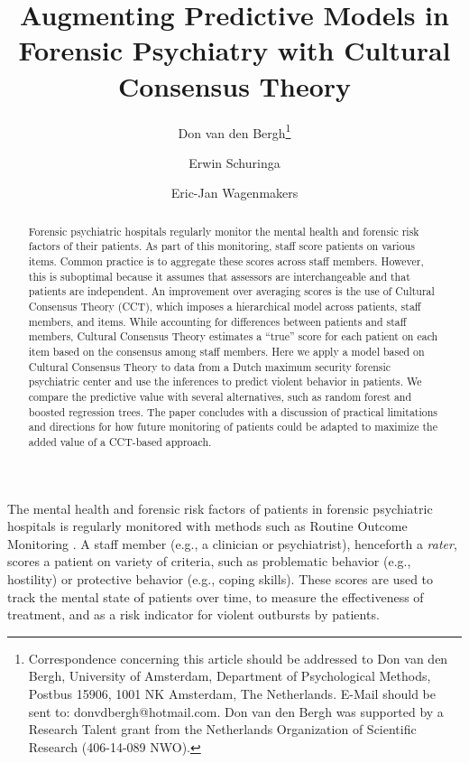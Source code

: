 \documentclass[a4paper,11pt]{article}
\title{Augmenting Predictive Models in Forensic Psychiatry with Cultural Consensus Theory}
\author[1]{Don van den Bergh\thanks{%
Correspondence concerning this article should be addressed to Don van den Bergh, University of Amsterdam, Department of Psychological Methods, Postbus 15906, 1001 NK Amsterdam, The Netherlands. 
E-Mail should be sent to: donvdbergh@hotmail.com.
Don van den Bergh was supported by a Research Talent grant from the Netherlands Organization of Scientific Research (406-14-089 NWO).}}
\author[2]{Erwin Schuringa}
\author[1]{Eric-Jan Wagenmakers}
\affil[1]{Department of Psychological Methods, University of Amsterdam}
\affil[2]{Forensic Psychiatric Center Dr. S. van Mesdag}
\date{}
\begin{document}
\maketitle


\begin{abstract}
Forensic psychiatric hospitals regularly monitor the mental health and forensic risk factors of their patients.
As part of this monitoring, staff score patients on various items.
Common practice is to aggregate these scores across staff members.
However, this is suboptimal because it assumes that assessors are interchangeable and that patients are independent.
An improvement over averaging scores is the use of Cultural Consensus Theory (CCT), which imposes a hierarchical model across patients, staff members, and items.
While accounting for differences between patients and staff members, Cultural Consensus Theory estimates a ``true'' score for each patient on each item based on the consensus among staff members.
Here we apply a model based on Cultural Consensus Theory to data from a Dutch maximum security forensic psychiatric center and use the inferences to predict violent behavior in patients.
We compare the predictive value with several alternatives, such as random forest and boosted regression trees.
The paper concludes with a discussion of practical limitations and directions for how future monitoring of patients could be adapted to maximize the added value of a CCT-based approach.
\end{abstract}


The mental health and forensic risk factors of patients in forensic psychiatric hospitals is regularly monitored with methods such as Routine Outcome Monitoring \parencite{deBeurs2011ROM}.
A staff member (e.g., a clinician or psychiatrist), henceforth a \emph{rater}, scores a patient on variety of criteria, such as problematic behavior (e.g., hostility) or protective behavior (e.g., coping skills).
These scores are used to track the mental state of patients over time, to measure the effectiveness of treatment, and as a risk indicator for violent outbursts by patients.
\end{document}
